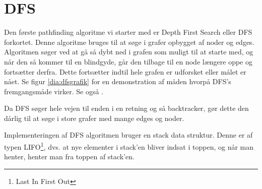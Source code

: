 \section{DFS}
Den første pathfinding algoritme vi starter med er Depth First Search eller DFS forkortet. Denne algoritme bruges til at søge i grafer opbygget af noder og edges. Algoritmen søger ved at gå så dybt ned i grafen som muligt til at starte med, og når den så kommer til en blindgyde, går den tilbage til en node længere oppe og fortsætter derfra. Dette fortsætter indtil hele grafen er udforsket eller målet er nået. Se figur \ref{dia:dfsgrafik} for en demonstration af måden hvorpå DFS's fremgangsmåde virker. Se også \textcite[210]{buckland}. 

Da DFS søger hele vejen til enden i en retning og så backtracker, gør dette den dårlig til at søge i store grafer med mange edges og noder.


Implementeringen af DFS algoritmen bruger en stack data struktur. Denne er af typen LIFO\footnote{Last In First Out}, dvs. at nye elementer i stack'en bliver indsat i toppen, og når man henter, henter man fra toppen af stack'en.